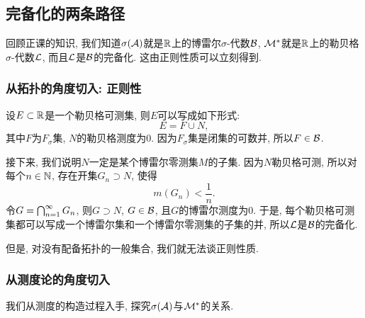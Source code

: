 \subsection{完备化的两条路径}
回顾正课的知识, 我们知道$\sigma(\mathcal{A})$就是$\mathbb{R}$上的博雷尔$\sigma$-代数$\mathcal{B}$, $\mathcal{M}^*$就是$\mathbb{R}$上的勒贝格$\sigma$-代数$\mathcal{L}$, 而且$\mathcal{L}$是$\mathcal{B}$的完备化. 
这由正则性质可以立刻得到. 
\subsubsection*{从拓扑的角度切入: 正则性}
设$E \subset \mathbb{R}$是一个勒贝格可测集, 则$E$可以写成如下形式:
$$E = F \cup N, $$
其中$F$为$F_\sigma$集, $N$的勒贝格测度为$0$. 因为$F_\sigma$集是闭集的可数并, 所以$F \in \mathcal{B}$. 

接下来, 我们说明$N$一定是某个博雷尔零测集$M$的子集. 因为$N$勒贝格可测, 所以对每个$n \in \mathbb{N}$, 存在开集$G_n \supset N$, 使得$$m(G_n) < \frac{1}{n}. $$
令$G = \bigcap_{n=1}^{\infty}G_n$, 则$G \supset N$, $G \in \mathcal{B}$, 且$G$的博雷尔测度为$0$. 于是, 每个勒贝格可测集都可以写成一个博雷尔集和一个博雷尔零测集的子集的并, 所以$\mathcal{L}$是$\mathcal{B}$的完备化. 


但是, 对没有配备拓扑的一般集合, 我们就无法谈正则性质.
\subsubsection*{从测度论的角度切入}
我们从测度的构造过程入手, 探究$\sigma(\mathcal{A})$与$\mathcal{M}^*$的关系. 

